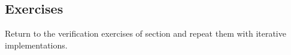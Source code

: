 \subsection*{Exercises}
Return to the verification exercises of section  and repeat them with iterative 
implementations.


%


%


